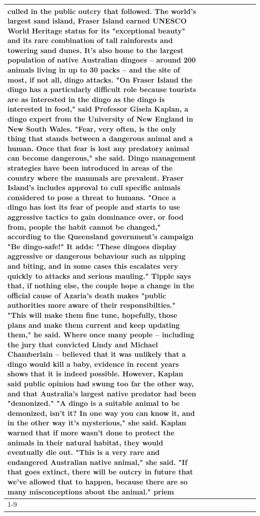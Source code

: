 \begin{table}[H]
\begin{tabular}{lllrlllll}
culled in the public outcry that followed. The world's largest sand island, Fraser Island earned UNESCO World Heritage status for its "exceptional beauty" and its rare combination of tall rainforests and towering sand dunes. It's also home to the largest population of native Australian dingoes -- around 200 animals living in up to 30 packs -- and the site of most, if not all, dingo attacks. "On Fraser Island the dingo has a particularly difficult role because tourists are as interested in the dingo as the dingo is interested in food," said Professor Gisela Kaplan, a dingo expert from the University of New England in New South Wales. "Fear, very often, is the only thing that stands between a dangerous animal and a human. Once that fear is lost any predatory animal can become dangerous," she said. Dingo management strategies have been introduced in areas of the country where the mammals are prevalent. Fraser Island's includes approval to cull specific animals considered to pose a threat to humans. "Once a dingo has lost its fear of people and starts to use aggressive tactics to gain dominance over, or food from, people the habit cannot be changed," according to the Queensland government's campaign "Be dingo-safe!" It adds: "These dingoes display aggressive or dangerous behaviour such as nipping and biting, and in some cases this escalates very quickly to attacks and serious mauling." Tipple says that, if nothing else, the couple hope a change in the official cause of Azaria's death makes "public authorities more aware of their responsibilties." "This will make them fine tune, hopefully, those plans and make them current and keep updating them," he said. Where once many people -- including the jury that convicted Lindy and Michael Chamberlain -- believed that it was unlikely that a dingo would kill a baby, evidence in recent years shows that it is indeed possible. However, Kaplan said public opinion had swung too far the other way, and that Australia's largest native predator had been "demonized." "A dingo is a suitable animal to be demonized, isn't it? In one way you can know it, and in the other way it's mysterious," she said. Kaplan warned that if more wasn't done to protect the animals in their natural habitat, they would eventually die out. "This is a very rare and endangered Australian native animal," she said. "If that goes extinct, there will be outcry in future that we've allowed that to happen, because there are so many misconceptions about the animal." priem \\
\cline{1-9}

\end{tabular}
\end{table}
